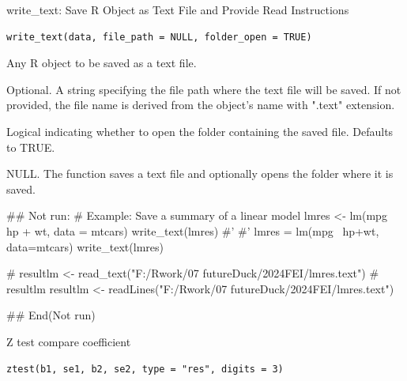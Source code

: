 \documentclass[a4paper]{book}
\begin{document}
%
\begin{Description}
write\_text: Save R Object as Text File and Provide Read Instructions
\end{Description}
%
\begin{Usage}
\begin{verbatim}
write_text(data, file_path = NULL, folder_open = TRUE)
\end{verbatim}
\end{Usage}
%
\begin{Arguments}
\begin{ldescription}
\item[\code{data}] Any R object to be saved as a text file.

\item[\code{file\_path}] Optional. A string specifying the file path where the text file will be saved.
If not provided, the file name is derived from the object's name with ".text" extension.

\item[\code{folder\_open}] Logical indicating whether to open the folder containing the saved file. Defaults to TRUE.
\end{ldescription}
\end{Arguments}
%
\begin{Value}
NULL. The function saves a text file and optionally opens the folder where it is saved.
\end{Value}
%
\begin{Examples}
\begin{ExampleCode}
\#\# Not run: 
# Example: Save a summary of a linear model
lmres <- lm(mpg ~ hp + wt, data = mtcars) %
write_text(lmres)
#'
#'
lmres = lm(mpg~ hp+wt, data=mtcars) %
write_text(lmres)

# resultlm <- read_text("F:/Rwork/07 futureDuck/2024FEI/lmres.text")
# resultlm
resultlm <- readLines("F:/Rwork/07 futureDuck/2024FEI/lmres.text")



## End(Not run)
\end{ExampleCode}
\end{Examples}
%
\begin{Description}
Z test compare coefficient
\end{Description}
%
\begin{Usage}
\begin{verbatim}
ztest(b1, se1, b2, se2, type = "res", digits = 3)
\end{verbatim}
\end{Usage}
\end{document}
